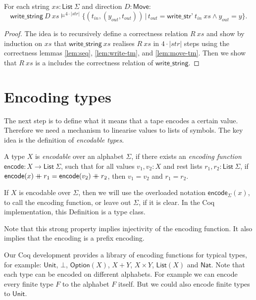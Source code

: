 \documentclass{psartcl}
\renewcommand{\vDash}{\models} \DeclareRobustCommand{\VDash}{\mathrel{|\mkern-2mu|}\joinrel \Relbar}
\newcommand{\MS}[1]{\textsf{#1}}
\newcommand\mdoubleplus{\ensuremath{\mathbin{+\mkern-10mu+}}}
\newcommand{\app}{\mdoubleplus}
\newcommand{\setOf}[1]{\bigl \{ #1 \bigr \}}
\newcommand{\setMap}[2]{\setOf{#1 \,\big|\, #2}}
\newcommand{\from}{:}
\renewcommand{\to}{\rightarrow}
\newcommand{\Option}{\MS{Option}}
\newcommand{\Nat}{\MS{Nat}}
\newcommand{\Unit}{\MS{Unit}}
\newcommand{\List}{\MS{List}}
\newcommand{\Move}{\MS{Move}}
\begin{document}
\begin{lemma}[Correctness of $\MS{write\_string}$]
  \label{lem:write-string}
  For each string $xs : \List~\Sigma$ and direction $D : \Move$:
  $$\MS{write\_string}~D~xs \vDash^{4 \cdot \left|str\right|} \setMap{(t_{in}, (y_{out}, t_{out}))}{t_{out} = \MS{write\_str'}~t_{in}~xs \land
    y_{out} = y}.$$
\end{lemma}
\begin{proof}
  The idea is to recursively define a correctness relation $R~xs$ and show by induction on $xs$ that $\MS{write\_string}~xs$ realises $R~xs$ in
  $4 \cdot \left|str\right|$ steps using the correctness lemmas \ref{lem:seq}, \ref{lem:write-tm}, and \ref{lem:move-tm}.
  Then we show that $R~xs$ is a includes the correctness relation of $\MS{write\_string}$.
\end{proof}

\section{Encoding types}
\label{sec:encode}

The next step is to define what it means that a tape encodes a certain value.
Therefore we need a mechanism to linearise values to lists of symbols.
The key idea is the definition of \emph{encodable types}.

\begin{definition}
  \label{def:code}
  A type $X$ is \emph{encodable} over an alphabet $\Sigma$, if there exists an \emph{encoding function}
  $\MS{encode} \from X \to \List~\Sigma$, such that for all values $v_1, v_2:X$ and rest lists $r_1, r_2:\List~\Sigma$,
  if $\MS{encode}(x) \app r_1 = \MS{encode}(v_2) \app r_2$, then
  $v_1 = v_2$ and $r_1 = r_2$.

  If $X$ is encodable over $\Sigma$, then we will use the overloaded notation $\MS{encode}_{\Sigma}(x)$, to call the encoding function, or leave out
  $\Sigma$, if it is clear.  In the Coq implementation, this Definition is a type class.
\end{definition}

Note that this strong property implies injectivity of the encoding function.
It also implies that the encoding is a prefix encoding.

Our Coq development provides a library of encoding functions for typical types, for example:  $\Unit$, $\bot$, $\Option(X)$, $X+Y$, $X \times Y$,
$\List(X)$ and $\Nat$.  Note that each type can be encoded on different alphabets.  For example we can encode every finite type $F$ to the alphabet
$F$ itself.  But we could also encode finite types to $\Unit$.
\end{document}
